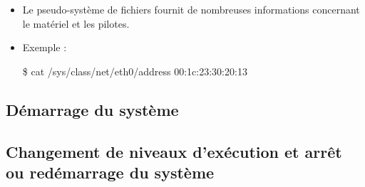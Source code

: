 \begin{frame}[fragile]{}

\begin{itemize}

\item Le pseudo-système de fichiers  fournit de nombreuses
informations concernant le matériel et les pilotes.

\item Exemple :

\begin{intercom}
\$ cat /sys/class/net/eth0/address
00:1c:23:30:20:13
\end{intercom}

\end{itemize}

\begin{toile}
\end{toile}

\end{frame}


\subsection{Démarrage du système}







\subsection{Changement de niveaux d'exécution et arrêt ou redémarrage du système}


